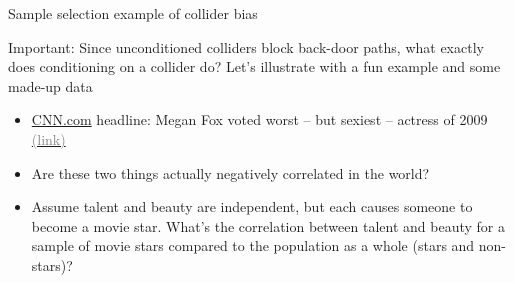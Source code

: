 \documentclass{beamer}
\newcommand{\myurlshort}[2]{\href{#1}{\textcolor{gray}{\textsf{#2}}}}
\begin{document}
\begin{frame}
\begin{itemize}
\begin{itemize}
\begin{center}
                  \end{center}


          \end{itemize}
  \end{itemize}
  \framebreak


\end{frame}


\begin{frame}{Sample selection example of collider bias}

  \alert{Important}: Since unconditioned colliders block back-door paths, what exactly does conditioning on a collider do? Let's illustrate with a fun example and some made-up data\\
  \begin{itemize}
    \item \underline{CNN.com} headline: Megan Fox voted worst -- but sexiest -- actress of 2009 \myurlshort{http://marquee.blogs.cnn.com/2009/12/30/megan-fox-voted-worst-but-sexiest-actress-of-2009/}{(link)}
    \item Are these two things actually negatively correlated in the world?
    \item Assume talent and beauty are independent, but each causes someone to become a movie star.  What's the correlation between talent and beauty for a sample of movie stars compared to the population as a whole (stars and non-stars)?
  \end{itemize}

\end{frame}
\end{document}
